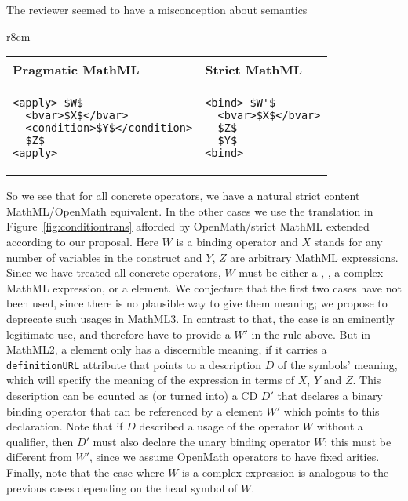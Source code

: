 \documentclass{llncs}
\begin{document}
\begin{newpart}{The reviewer seemed to have a misconception about semantics}
\begin{wrapfigure}r{8cm}\centering\vspace*{-2em}
\lstset{language=MathML2,mathescape,frame=none,numbers=none}
\lstset{aboveskip=-.7em,belowskip=-1.2em}
\begin{tabular}{|p{4.3cm}|p{3cm}|}\hline
  Pragmatic MathML & Strict MathML\\\hline\hline
\begin{lstlisting}
<apply> $W$
  <bvar>$X$</bvar>
  <condition>$Y$</condition>
  $Z$
<apply>
\end{lstlisting}
& 
\begin{lstlisting}[language=MathML2]
<bind> $W'$
  <bvar>$X$</bvar>
  $Z$
  $Y$
<bind>
\end{lstlisting}\\\hline
\end{tabular}
\caption{Translating MathML with {}}\label{fig:conditiontrans}\vspace*{-2em}
\end{wrapfigure}
So we see that for all concrete operators, we have a natural strict content
MathML/OpenMath equivalent. In the other cases we use the translation in
Figure~\ref{fig:conditiontrans} afforded by OpenMath/strict MathML extended according to
our proposal. Here $W$ is a binding operator and $X$ stands for any number of variables in
the {} construct and $Y$, $Z$ are arbitrary MathML expressions. Since we
have treated all concrete operators, $W$ must be either a {}, {},
a complex MathML expression, or a {} element. We conjecture that the
first two cases have not been used, since there is no plausible way to give them meaning;
we propose to deprecate such usages in MathML3. In contrast to that, the
{} case is an eminently legitimate use, and therefore have to provide a
$W'$ in the rule above. But in MathML2, a {} element only has a
discernible meaning, if it carries a {\texttt{definitionURL}} attribute that points to a
description $D$ of the symbols' meaning, which will specify the meaning of the expression
in terms of $X$, $Y$ and $Z$. This description can be counted as (or turned into) a CD
$D'$ that declares a binary binding operator that can be referenced by a
{} element $W'$ which points to this declaration. Note that if $D$
described a usage of the operator $W$ without a {} qualifier, then $D'$
must also declare the unary binding operator $W$; this must be different from $W'$, since
we assume OpenMath operators to have fixed arities. Finally, note that the case where $W$
is a complex expression is analogous to the previous cases depending on the head symbol of
$W$.\iffull{}\fi


\end{newpart}
\end{document}

